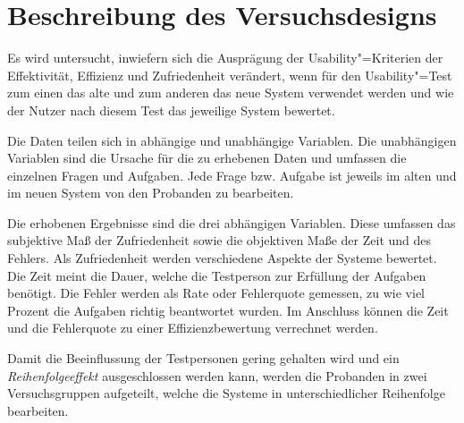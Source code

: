 \section{Beschreibung des Versuchsdesigns}
\label{ch:Ergebnisse:sec:Versuchsdesign}

Es wird untersucht, inwiefern sich die Ausprägung der Usability"=Kriterien der Effektivität, Effizienz und Zufriedenheit verändert, wenn für den Usability"=Test zum einen das alte und zum anderen das neue System verwendet werden und wie der Nutzer nach diesem Test das jeweilige System bewertet.

Die Daten teilen sich in abhängige und unabhängige Variablen. Die unabhängigen Variablen sind die Ursache für die zu erhebenen Daten und umfassen die einzelnen Fragen und Aufgaben. Jede Frage bzw. Aufgabe ist jeweils im alten und im neuen System von den Probanden zu bearbeiten.

Die erhobenen Ergebnisse sind die drei abhängigen Variablen. Diese umfassen das subjektive Maß der Zufriedenheit sowie die objektiven Maße der Zeit und des Fehlers.
Als Zufriedenheit werden verschiedene Aspekte der Systeme bewertet. Die Zeit meint die Dauer, welche die Testperson zur Erfüllung der Aufgaben benötigt. Die Fehler werden als Rate oder Fehlerquote gemessen, zu wie viel Prozent die Aufgaben richtig beantwortet wurden.
Im Anschluss können die Zeit und die Fehlerquote zu einer Effizienzbewertung verrechnet werden.

Damit die Beeinflussung der Testpersonen gering gehalten wird und ein \textit{Reihenfolgeeffekt} \cite{AnnaSchantl:2009:Reihenfolgeeffekt} ausgeschlossen werden kann, werden die Probanden in zwei Versuchsgruppen aufgeteilt, welche die Systeme in unterschiedlicher Reihenfolge bearbeiten.






